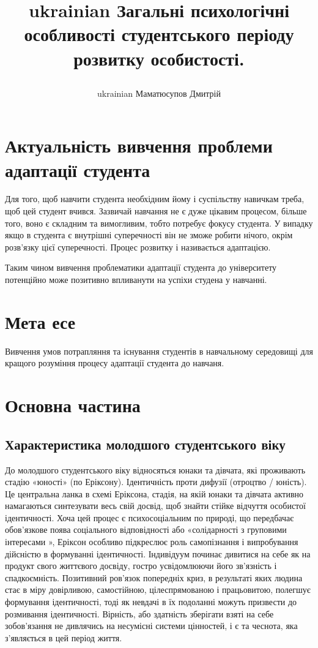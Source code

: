 \documentclass[a4paper,12pt, titlepage]{article}
\title{\begin{otherlanguage*}{ukrainian}
           Загальні психологічні особливості студентського періоду розвитку особистості.
\end{otherlanguage*}}
\author{\begin{otherlanguage*}{ukrainian} Маматюсупов Дмитрій \end{otherlanguage*}}
\date{\begin{otherlanguage*}{ukrainian} Листопад 2020 \end{otherlanguage*}}
\begin{document}
    \maketitle

    \tableofcontents

    \section{Актуальність вивчення проблеми адаптації студента}
    Для того, щоб навчити студента необхідним йому і суспільству навичкам
    треба, щоб цей студент вчився. Зазвичай навчання не є дуже цікавим процесом,
    більше того, воно є складним та вимогливим, тобто потребує фокусу студента.
    У випадку якщо в студента є внутрішні суперечності він не зможе робити нічого,
    окрім розв'язку цієї суперечності. Процес розвитку і називається адаптацією.

    Таким чином вивчення проблематики адаптації студента до університету потенційно
    може позитивно впливанути на успіхи студена у навчанні.

    \section{Мета есе}
    Вивчення умов потрапляння та існування студентів в навчальному середовищі
    для кращого розуміння процесу адаптації студента до навчаня.

    \section{Основна частина}

    \subsection{Характеристика молодшого студентського віку}
    До молодшого студентського віку відносяться юнаки та дівчата,
    які проживають стадію «юності» (по Еріксону). Ідентичність проти
    дифузії (отроцтво / юність). Це центральна ланка в схемі Еріксона,
    стадія, на якій юнаки та дівчата активно намагаються синтезувати весь
    свій досвід, щоб знайти стійке відчуття особистої ідентичності. Хоча
    цей процес є психосоціальним по природі, що передбачає
    обов'язкове поява соціального відповідності або «солідарності з
    груповими інтересами », Еріксон особливо підкреслює роль самопізнання і
    випробування дійсністю в формуванні ідентичності. Індивідуум
    починає дивитися на себе як на продукт свого життєвого досвіду, гостро
    усвідомлюючи його зв'язність і спадкоємність. Позитивний ров'язок
    попередніх криз, в результаті яких людина стає в міру
    довірливою, самостійною, цілеспрямованою і працьовитою,
    полегшує формування ідентичності, тоді як невдачі в їх подоланні
    можуть призвести до розмивання ідентичності. Вірність, або здатність
    зберігати взяті на себе зобов'язання не дивлячись на несумісні системи
    цінностей, і є та чеснота, яка з'являється в цей період життя.
\end{document}
